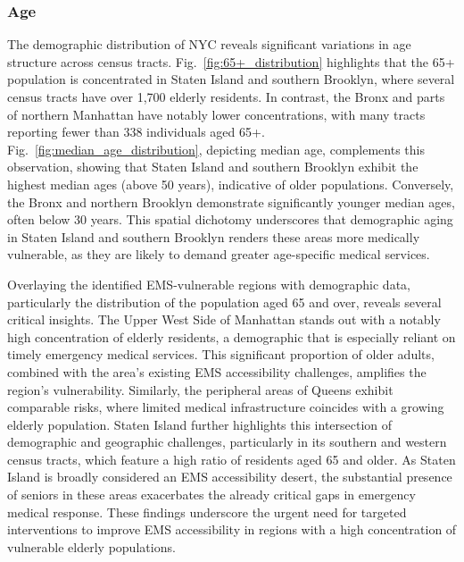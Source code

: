 \subsubsection{Age}
The demographic distribution of NYC reveals significant variations in age structure across census tracts. Fig.~\ref{fig:65+_distribution} highlights that the 65+ population is concentrated in Staten Island and southern Brooklyn, where several census tracts have over 1,700 elderly residents. In contrast, the Bronx and parts of northern Manhattan have notably lower concentrations, with many tracts reporting fewer than 338 individuals aged 65+. Fig.~\ref{fig:median_age_distribution}, depicting median age, complements this observation, showing that Staten Island and southern Brooklyn exhibit the highest median ages (above 50 years), indicative of older populations. Conversely, the Bronx and northern Brooklyn demonstrate significantly younger median ages, often below 30 years. This spatial dichotomy underscores that demographic aging in Staten Island and southern Brooklyn renders these areas more medically vulnerable, as they are likely to demand greater age-specific medical services.

Overlaying the identified EMS-vulnerable regions with demographic data, particularly the distribution of the population aged 65 and over, reveals several critical insights. The Upper West Side of Manhattan stands out with a notably high concentration of elderly residents, a demographic that is especially reliant on timely emergency medical services. This significant proportion of older adults, combined with the area's existing EMS accessibility challenges, amplifies the region’s vulnerability. Similarly, the peripheral areas of Queens exhibit comparable risks, where limited medical infrastructure coincides with a growing elderly population. Staten Island further highlights this intersection of demographic and geographic challenges, particularly in its southern and western census tracts, which feature a high ratio of residents aged 65 and older. As Staten Island is broadly considered an EMS accessibility desert, the substantial presence of seniors in these areas exacerbates the already critical gaps in emergency medical response. These findings underscore the urgent need for targeted interventions to improve EMS accessibility in regions with a high concentration of vulnerable elderly populations.

